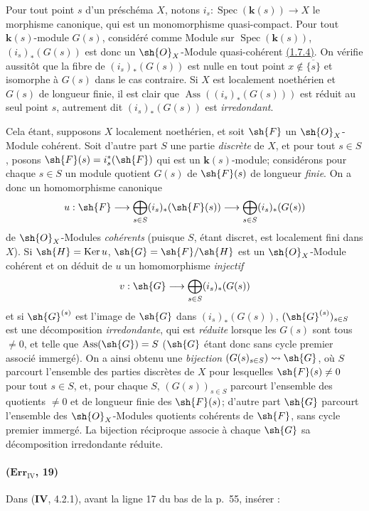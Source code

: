 \begin{remark}[3.2.9]
\label{IV.3.2.9}
Pour tout point $s$ d'un préschéma $X$, notons
$i_s:\operatorname{Spec}(\boldsymbol{k}(s))\to X$ le morphisme canonique, qui est
un monomorphisme quasi-compact. Pour tout $\boldsymbol{k}(s)$-module $G(s)$,
considéré comme Module sur $\operatorname{Spec}(\boldsymbol{k}(s))$,
$(i_s)_*(G(s))$ est donc un $\sh{O}_X$-Module quasi-cohérent
{\hyperref[canon-index.ega4.c04.statement.1-7-4]{(1.7.4)}}. On vérifie aussitôt
que la fibre de $(i_s)_*(G(s))$ est nulle en tout point
$x\notin\overline{\{s\}}$ et isomorphe à $G(s)$ dans le cas contraire.
Si $X$ est localement noethérien et $G(s)$ de longueur finie, il est
clair que $\operatorname{Ass}((i_s)_*(G(s)))$ est réduit au seul point
$s$, autrement dit $(i_s)_*(G(s))$ est \emph{irredondant}.

Cela étant, supposons $X$ localement noethérien, et soit $\sh{F}$ un
$\sh{O}_X$-Module cohérent. Soit d'autre part $S$ une partie \emph{discrète}
de $X$, et pour tout $s\in S$, posons
$\sh{F}(s)=i_s^*(\sh{F})$ qui est un $\boldsymbol{k}(s)$-module; considérons pour
chaque $s\in S$ un module quotient $G(s)$ de $\sh{F}(s)$ de longueur
\emph{finie}. On a donc un homomorphisme canonique
\[
 u:\sh{F}\longrightarrow
 \bigoplus_{s\in S}(i_s)_*(\sh{F}(s))\longrightarrow
 \bigoplus_{s\in S}(i_s)_*(G(s))
\]
de $\sh{O}_X$-Modules \emph{cohérents} (puisque $S$, étant discret, est
localement fini dans $X$). Si $\sh{H}=\operatorname{Ker}u$,
$\sh{G}=\sh{F}/\sh{H}$ est un $\sh{O}_X$-Module cohérent et on déduit
de $u$ un homomorphisme \emph{injectif}
\[
 v:\sh{G}\longrightarrow\bigoplus_{s\in S}(i_s)_*(G(s))
\]
et si $\sh{G}^{(s)}$ est l'image de $\sh{G}$ dans $(i_s)_*(G(s))$,
$(\sh{G}^{(s)})_{s\in S}$ est une décomposition \emph{irredondante}, qui est
\emph{réduite} lorsque les $G(s)$ sont tous $\neq0$, et telle que
$\operatorname{Ass}(\sh{G})=S$ ($\sh{G}$ étant donc sans cycle premier
associé immergé). On a ainsi obtenu une \emph{bijection}
$(G(s)_{s\in S})\leadsto\sh{G}$, où $S$ parcourt l'ensemble des
parties discrètes de $X$ pour lesquelles $\sh{F}(s)\neq0$ pour tout
$s\in S$, et, pour chaque $S$, $(G(s))_{s\in S}$ parcourt l'ensemble
des quotients $\neq0$ et de longueur finie des $\sh{F}(s)$; d'autre
part $\sh{G}$ parcourt l'ensemble des $\sh{O}_X$-Modules quotients
cohérents de $\sh{F}$, sans cycle premier immergé. La bijection
réciproque associe à chaque $\sh{G}$ sa décomposition irredondante
réduite.
\end{remark}

\paragraph{($\mathbf{Err}_{\mathrm{IV}}$, 19)}
Dans (\textbf{IV}, 4.2.1), avant la ligne 17 du bas de la p.~55, insérer :

